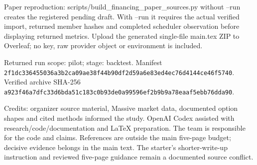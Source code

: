 \documentclass[11pt,letterpaper]{article}
\begin{document}
Paper reproduction: scripts/build\_financing\_paper\_sources.py without --run creates the registered pending draft. With --run it requires the actual verified import, returned member hashes and completed scheduler observation before displaying returned metrics. Upload the generated single-file main.tex ZIP to Overleaf; no key, raw provider object or environment is included.

Returned run scope: pilot; stage: backtest. Manifest \nolinkurl{2f1dc336455036a3b2ca09ae38f44b90df2d59a6e83ed4ec76d4144ce46f5740}. Verified archive SHA-256 \nolinkurl{a923f46a7dfc33d6bda51c183c0b93de0a99596ef2b9b9a78eaaf5ebb76dda90}.

Credits: organizer source material, Massive market data, documented option shapes and cited methods informed the study. OpenAI Codex assisted with research/code/documentation and LaTeX preparation. The team is responsible for the code and claims. References are outside the main five-page budget; decisive evidence belongs in the main text. The starter's shorter-write-up instruction and reviewed five-page guidance remain a documented source conflict.
\end{document}
